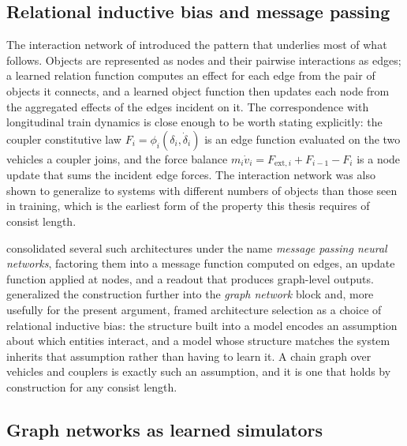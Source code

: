 \subsection{Relational inductive bias and message passing}
\label{sec:graph_message_passing}

The interaction network of \cite{battaglia2016interaction} introduced the pattern that underlies most of what follows. Objects are represented as nodes and their pairwise interactions as edges; a learned relation function computes an effect for each edge from the pair of objects it connects, and a learned object function then updates each node from the aggregated effects of the edges incident on it. The correspondence with longitudinal train dynamics is close enough to be worth stating explicitly: the coupler constitutive law $F_i = \phi_i(\delta_i,\dot{\delta}_i)$ is an edge function evaluated on the two vehicles a coupler joins, and the force balance $m_i\dot{v}_i = F_{\mathrm{ext},i} + F_{i-1} - F_i$ is a node update that sums the incident edge forces. The interaction network was also shown to generalize to systems with different numbers of objects than those seen in training, which is the earliest form of the property this thesis requires of consist length.

\cite{gilmer2017mpnn} consolidated several such architectures under the name \emph{message passing neural networks}, factoring them into a message function computed on edges, an update function applied at nodes, and a readout that produces graph-level outputs. \cite{battaglia2018relational} generalized the construction further into the \emph{graph network} block and, more usefully for the present argument, framed architecture selection as a choice of relational inductive bias: the structure built into a model encodes an assumption about which entities interact, and a model whose structure matches the system inherits that assumption rather than having to learn it. A chain graph over vehicles and couplers is exactly such an assumption, and it is one that holds by construction for any consist length.

\subsection{Graph networks as learned simulators}
\label{sec:graph_learned_simulators}

